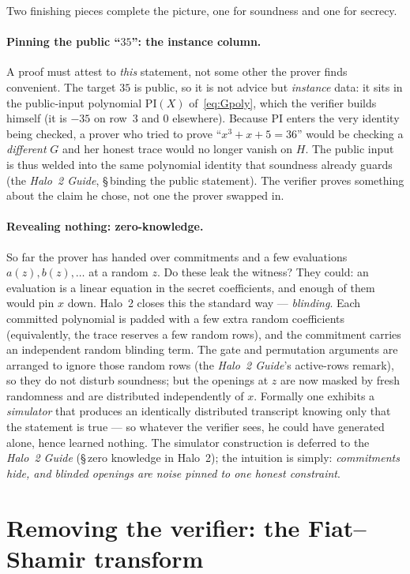 \documentclass[11pt,a4paper]{article}
\theoremstyle{definition}
\begin{document}
Two finishing pieces complete the picture, one for soundness and one for
secrecy.

\paragraph{Pinning the public ``$35$'': the instance column.} A proof must
attest to \emph{this} statement, not some other the prover finds convenient.
The target $35$ is public, so it is not advice but \emph{instance} data: it
sits in the public-input polynomial $\mathrm{PI}(X)$ of~\eqref{eq:Gpoly}, which
the verifier builds himself (it is $-35$ on row~$3$ and $0$ elsewhere). Because
$\mathrm{PI}$ enters the very identity being checked, a prover who tried to
prove ``$x^3 + x + 5 = 36$'' would be checking a \emph{different} $G$ and her
honest trace would no longer vanish on $H$. The public input is thus welded
into the same polynomial identity that soundness already guards (the
\emph{Halo~2 Guide}, \S\,binding the public statement). The verifier proves
something about the claim he chose, not one the prover swapped in.

\paragraph{Revealing nothing: zero-knowledge.} So far the prover has handed
over commitments and a few evaluations $a(z), b(z), \dots$ at a random $z$. Do
these leak the witness? They could: an evaluation is a linear equation in the
secret coefficients, and enough of them would pin $x$ down. Halo~2 closes this
the standard way --- \emph{blinding}. Each committed polynomial is padded with
a few extra random coefficients (equivalently, the trace reserves a few random
rows), and the commitment carries an independent random blinding term. The
gate and permutation arguments are arranged to ignore those random rows
(the \emph{Halo~2 Guide}'s active-rows remark), so they do not disturb
soundness; but the openings at $z$ are now masked by fresh randomness and are
distributed independently of $x$. Formally one exhibits a \emph{simulator} that
produces an identically distributed transcript knowing only that the statement
is true --- so whatever the verifier sees, he could have generated alone,
hence learned nothing. The simulator construction is deferred to the
\emph{Halo~2 Guide} (\S\,zero knowledge in Halo~2); the intuition is simply:
\emph{commitments hide, and blinded openings are noise pinned to one honest
constraint}.

\section{Removing the verifier: the Fiat--Shamir transform}\label{sec:fs}
\end{document}
